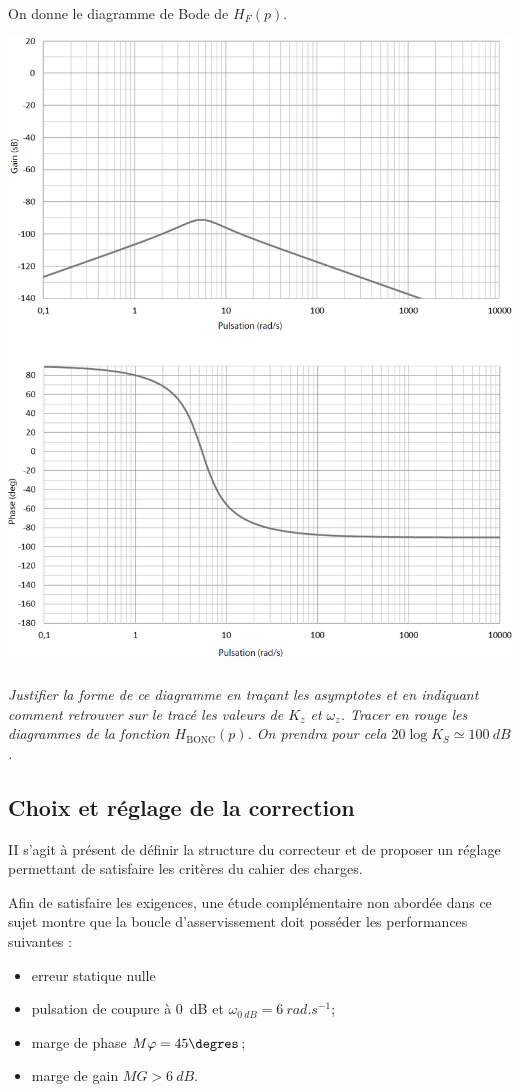 \documentclass[10pt,fleqn]{article} %
\begin{document}
\begin{multicols}{2}
On donne le diagramme de Bode de $H_F(p)$.

\begin{center}
\includegraphics[width=.9\linewidth]{images/fig_03}
\end{center}

\subparagraph{}\textit{Justifier la forme de ce diagramme en traçant les asymptotes et en indiquant comment retrouver sur le tracé les valeurs de $K_z$ et $\omega_z$. Tracer en rouge les diagrammes de la fonction $H_{\text{BONC}}(p)$. On prendra pour cela $20\log K_S \simeq \SI{100}{dB}$.}
\ifprof
\begin{corrige}
\end{corrige}
\else
\fi

\subsection*{Choix et réglage de la correction}
\begin{obj}
II s'agit à présent de définir la structure du correcteur et de proposer un réglage permettant de satisfaire les critères du cahier des charges.
\end{obj}

Afin de satisfaire les exigences, une étude complémentaire non abordée dans ce sujet montre que la boucle d'asservissement doit posséder les performances suivantes :
\begin{itemize}
\item erreur statique nulle
\item pulsation de coupure à \SI{0}{dB} et $\omega_{\SI{0}{dB}}= \SI{6}{rad.s^{-1}}$;
\item marge de phase $M\varphi = 45\degres$;
\item marge de gain $MG > \SI{6}{dB}$.
\end{itemize}



\end{multicols}
\end{document}
